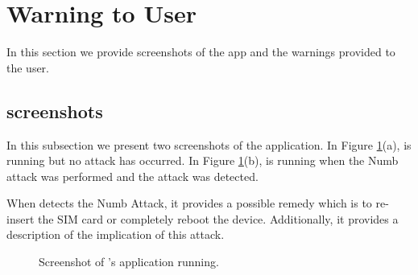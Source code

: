 \section{\system Warning to User}
\label{app:phoenix_warning_to_user}
In this section we provide screenshots of the \system app and the warnings
provided to the user.

\subsection{\system screenshots}
In this subsection we present two screenshots of the \system application.
In Figure \ref{fig:phoenix_app_screenshots}(a), \system is running but no attack
has occurred. In Figure \ref{fig:phoenix_app_screenshots}(b), \system is running
when the Numb attack was performed and the attack was detected.

When \system detects the Numb Attack, it provides a possible remedy which is
to re-insert the SIM card or completely reboot the device. Additionally,
it provides a description of the implication of this attack.

\begin{figure}[t]
\centering
{}
\qquad
{}
	\caption{Screenshot of \system's application running.}
	\label{fig:phoenix_app_screenshots}
\end{figure}
